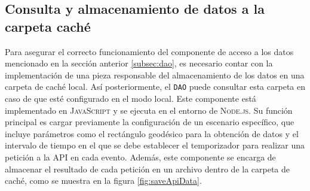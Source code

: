 \documentclass[a4paper, 11pt]{book}
\begin{document}
\subsection{Consulta y almacenamiento de datos a la carpeta caché}
\label{subsec:obtencionCache}
Para asegurar el correcto funcionamiento del componente de acceso a los datos mencionado en la sección anterior \ref{subsec:dao}, es necesario contar con la implementación de una pieza responsable del almacenamiento de los datos en una carpeta de caché local. Así posteriormente, el \texttt{\gls{DAO}} puede consultar esta carpeta en caso de que esté configurado en el modo local.
Este componente está implementado en \textsc{JavaScript} y se ejecuta en el entorno de \textsc{Node.js}. Su función principal es cargar previamente la configuración de un escenario específico, que incluye parámetros como el rectángulo geodésico para la obtención de datos y el intervalo de tiempo en el que se debe establecer el temporizador para realizar una petición a la \textsc{API} en cada evento. Además, este componente se encarga de almacenar el resultado de cada petición en un archivo dentro de la carpeta de caché, como se muestra en la figura \ref{fig:saveApiData}.
\end{document}
